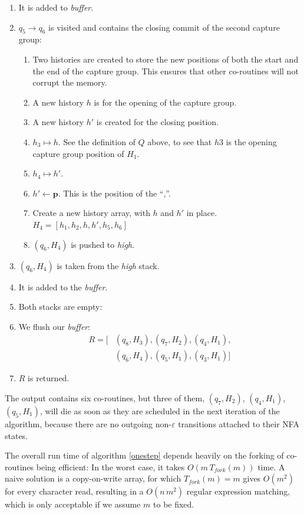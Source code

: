 \documentclass[11pt]{Thesis}
\theoremstyle{definition}
\newcommand{\pos}{\mathbf{\mathbf{p}}}
\begin{document}
\begin{example}
\begin{enumerate}
\item It is added to \emph{buffer}.
\item $q_5\rightarrow q_6$ is visited and contains the closing commit of the
  second capture group:\begin{enumerate}
  \item Two histories are created to store the new positions of both the start
    and the end of the capture group. This ensures that other co-routines will
    not corrupt the memory.
	\item A new history $h$ is for the opening of the capture group.
	\item A new history $h'$ is created for the closing position.
  \item $h_3 \mapsto h$. See the definition of $Q$ above, to see that $h3$ is
    the opening capture group position of $H_1$.
	\item $h_4 \mapsto h'$.
	\item $h'\leftarrow\pos$. This is the position of the ``,''.
	\item Create a new history array, with $h$ and $h'$ in place. 
		$H_4 = [h_1, h_2, h, h', h_5, h_6]$
	\item $(q_6, H_4)$ is pushed to \emph{high}.
\end{enumerate}
\item $(q_6, H_4)$ is taken from the \emph{high} stack.
\item It is added to the \emph{buffer}.
\item Both stacks are empty:
\item We flush our \emph{buffer}: 
\begin{align*}
R=[&(q_8, H_3), (q_7, H_2), (q_4, H_1),\\ &(q_6, H_4), (q_5, H_1), (q_3, H_1)]
\end{align*}
\item $R$ is returned.
\end{enumerate}
\end{example}

The output contains six co-routines, but three of them,  $(q_7, H_2)$,
$(q_4, H_1)$,  $(q_5, H_1)$, will die as soon as they are scheduled in
the next iteration of the algorithm, because there are no outgoing
non-$\varepsilon$ transitions attached to their NFA states.

The overall run time of algorithm \ref{onestep} depends heavily on the 
forking of co-routines being efficient: In the worst case, it takes
$O(m\, T_{fork}(m))$ time. A naive solution is a copy-on-write array, for
which $T_{fork}(m)=m$ gives $O(m^2)$ for every character read, resulting
in a $O(n\,m^2)$ regular expression matching, which is only acceptable
if we assume $m$ to be fixed.
\end{document}
